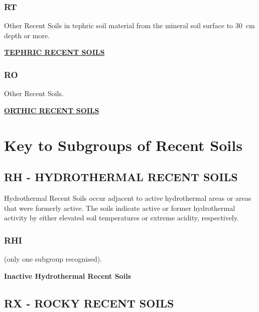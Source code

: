 \documentclass[
  letterpaper,
  DIV=11,
  numbers=noendperiod]{scrreprt}
\begin{document}
\hypertarget{sec-key-RT}{%
\subsubsection{\texorpdfstring{\textbf{RT}}{RT}}\label{sec-key-RT}}

Other Recent Soils in tephric soil material from the mineral soil
surface to 30~cm depth or more.

\protect\hyperlink{sec-RT}{\textbf{TEPHRIC RECENT SOILS}}

\hypertarget{sec-key-RO}{%
\subsubsection{\texorpdfstring{\textbf{RO}}{RO}}\label{sec-key-RO}}

Other Recent Soils.

\protect\hyperlink{sec-RO}{\textbf{ORTHIC RECENT SOILS}}

\hypertarget{sec-sub-R}{%
\section{Key to Subgroups of Recent Soils}\label{sec-sub-R}}

\hypertarget{sec-RH}{%
\subsection{\texorpdfstring{\textbf{RH} - HYDROTHERMAL RECENT
SOILS}{RH - HYDROTHERMAL RECENT SOILS}}\label{sec-RH}}

Hydrothermal Recent Soils occur adjacent to active hydrothermal areas or
areas that were formerly active. The soils indicate active or former
hydrothermal activity by either elevated soil temperatures or extreme
acidity, respectively.

\hypertarget{sec-key-RHI}{%
\subsubsection{\texorpdfstring{\textbf{RHI}}{RHI}}\label{sec-key-RHI}}

(only one subgroup recognised).

\textbf{Inactive Hydrothermal Recent Soils}

\hypertarget{sec-RX}{%
\subsection{\texorpdfstring{\textbf{RX} - ROCKY RECENT
SOILS}{RX - ROCKY RECENT SOILS}}\label{sec-RX}}
\end{document}
